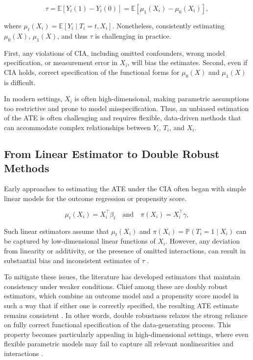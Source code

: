 \documentclass{article}
\numberwithin{equation}{section}
\begin{document}
\begin{equation}
    \tau = \mathbb{E}[Y_i(1) - Y_i(0)] = \mathbb{E}[\mu_1(X_i) - \mu_0(X_i)],
\label{eq:tau_hat_potential_outcome_diff_means}
\end{equation}

where \(\mu_t(X_i) = \mathbb{E}[Y_i \mid T_i = t, X_i]\). Nonetheless, consistently estimating \(\mu_0(X)\), \(\mu_1(X)\), and thus \(\tau\) is challenging in practice.

First, any violations of CIA, including omitted confounders, wrong model specification, or measurement error in \(X_i\), will bias the estimates. Second, even if CIA holds, correct specification of the functional forms for \(\mu_0(X)\) and \(\mu_1(X)\) is difficult.

In modern settings, \(X_i\) is often high-dimensional, making parametric assumptions too restrictive and prone to model misspecification. Thus, an unbiased estimation of the ATE is often challenging \cite{Chernozhukov2018} and requires flexible, data-driven methods that can accommodate complex relationships between \(Y_i\), \(T_i\), and \(X_i\).

\subsection{From Linear Estimator to Double Robust Methods}
\label{subsec:from_linear_estimator_to_double_robust_methods}

Early approaches to estimating the ATE under the CIA often began with simple linear models for the outcome regression or propensity score. 

\begin{equation}
    \mu_t(X_i) = X_i^\top \beta_t \quad \text{and} \quad \pi(X_i) = X_i^\top \gamma,
\label{eq:linear_assumption_example}
\end{equation}

Such linear estimators assume that \(\mu_t(X_i)\) and \(\pi(X_i)=\mathbb{P}(T_i=1 \mid X_i)\) can be captured by low-dimensional linear functions of \(X_i\). However, any deviation from linearity or additivity, or the presence of omitted interactions, can result in substantial bias and inconsistent estimates of \(\tau\) \cite{ImbensRubin2015}.

To mitigate these issues, the literature has developed estimators that maintain consistency under weaker conditions. Chief among these are doubly robust estimators, which combine an outcome model and a propensity score model in such a way that if either one is correctly specified, the resulting ATE estimate remains consistent \cite{RobinsRotnitzkyZhao1994, BangRobins2005}. In other words, double robustness relaxes the strong reliance on fully correct functional specification of the data-generating process. This property becomes particularly appealing in high-dimensional settings, where even flexible parametric models may fail to capture all relevant nonlinearities and interactions \cite{Chernozhukov2018}.
\end{document}

